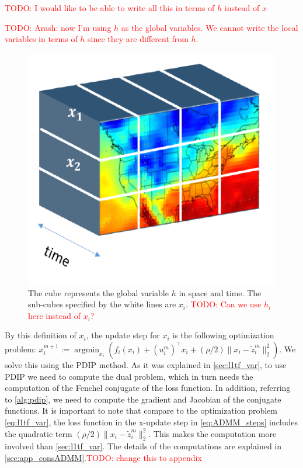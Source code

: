\documentclass{article}
\DeclareMathOperator*{\argmin}{argmin}
\newcommand{\attn}[1]{\textcolor{red}{TODO: #1}}
\begin{document}
\attn{I would like to be able to write all this in terms of $h$ instead of $x$}

\attn{Arash: now I'm using $h$ as the global variables. We cannot write the local variables in terms of $h$ since they are different from $h$.}
  
  

\begin{figure}[tb]
  \centering
  \includegraphics[height=.2\textheight]{Figures/data_cube}
    \caption{The cube represents the global variable $h$ in space and
      time. The sub-cubes specified by the white lines are
      $x_i$. \attn{Can we use $h_i$ here instead of $x_i$?}}
    \label{fig:data_cube}
\end{figure} 


By this definition of $x_i$, the update step for $x_i$ is the
following optimization problem: $x_i^{m+1}:=\argmin_{x_i} ( f_i(x_i) +
(u_i^m)^\top x_i + (\rho/2) \lVert x_i-\tilde{z}_i^m \lVert_2^2)$. We solve this using the PDIP method. As it was explained in \autoref{sec:l1tf_var}, to use PDIP we need to compute the dual problem, which in turn needs the computation of the Fenchel conjugate of the loss function. In addition, referring to \autoref{alg:pdip}, we need to compute the gradient and Jacobian of the conjugate functions. It is important to note that compare to the optimization problem \autoref{eq:l1tf_var}, the loss function in the x-update step in \autoref{eq:ADMM_steps} includes the quadratic term $(\rho/2) \lVert x_i-\tilde{z}_i^m \lVert_2^2$. This makes the computation more involved than \autoref{sec:l1tf_var}. The details of the computations are explained in \autoref{sec:app_consADMM}.\attn{change this to appendix}
\end{document}
